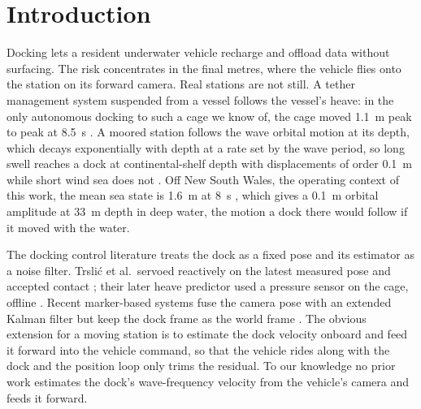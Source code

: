\section{Introduction}
\label{sec:intro}

Docking lets a resident underwater vehicle recharge and offload data without surfacing. The risk concentrates in the final metres, where the vehicle flies onto the station on its forward camera. Real stations are not still. A tether management system suspended from a vessel follows the vessel's heave: in the only autonomous docking to such a cage we know of, the cage moved 1.1~m peak to peak at 8.5~s \cite{trslic2020vision}. A moored station follows the wave orbital motion at its depth, which decays exponentially with depth at a rate set by the wave period, so long swell reaches a dock at continental-shelf depth with displacements of order 0.1~m while short wind sea does not \cite{holthuijsen2007waves}. Off New South Wales, the operating context of this work, the mean sea state is 1.6~m at 8~s \cite{short1992wave,kinsela2024nearshore}, which gives a 0.1~m orbital amplitude at 33~m depth in deep water, the motion a dock there would follow if it moved with the water.

The docking control literature treats the dock as a fixed pose and its estimator as a noise filter. Trsli\'c et al.\ servoed reactively on the latest measured pose and accepted contact \cite{trslic2020vision}; their later heave predictor used a pressure sensor on the cage, offline \cite{trslic2020neuro}. Recent marker-based systems fuse the camera pose with an extended Kalman filter but keep the dock frame as the world frame \cite{gunzel2026docking,ni2025vision}. The obvious extension for a moving station is to estimate the dock velocity onboard and feed it forward into the vehicle command, so that the vehicle rides along with the dock and the position loop only trims the residual. To our knowledge no prior work estimates the dock's wave-frequency velocity from the vehicle's camera and feeds it forward.

